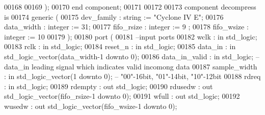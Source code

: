 \begin{DoxyCode}
00168         
00169         );
00170 \textcolor{keywordflow}{end} \textcolor{keywordflow}{component};
00171 
00172 
00173 \textcolor{keywordflow}{component} decompress \textcolor{keywordflow}{is}
00174   \textcolor{keywordflow}{generic} (
00175             dev_family      : \textcolor{comment}{string}  := \textcolor{keyword}{"Cyclone IV E"};
00176             data_width      : \textcolor{comment}{integer} := \textcolor{vhdllogic}{}\textcolor{vhdllogic}{31};
00177             fifo_rsize      : \textcolor{comment}{integer} := \textcolor{vhdllogic}{}\textcolor{vhdllogic}{9} ;
00178             fifo_wsize      : \textcolor{comment}{integer} := \textcolor{vhdllogic}{}\textcolor{vhdllogic}{10}
00179             );
00180   \textcolor{keywordflow}{port} (
00181 \textcolor{keyword}{        --input ports }
00182             wclk          : \textcolor{keywordflow}{in} \textcolor{comment}{std\_logic};
00183             rclk          : \textcolor{keywordflow}{in} \textcolor{comment}{std\_logic};
00184             reset_n       : \textcolor{keywordflow}{in} \textcolor{comment}{std\_logic};
00185             data_in       : \textcolor{keywordflow}{in} \textcolor{comment}{std\_logic\_vector}(data_width\textcolor{vhdlchar}{-}\textcolor{vhdllogic}{}\textcolor{vhdllogic}{1} \textcolor{keywordflow}{downto} \textcolor{vhdllogic}{}\textcolor{vhdllogic}{0});
00186             data_in_valid : \textcolor{keywordflow}{in} \textcolor{comment}{std\_logic}; \textcolor{keyword}{-- data\_in leading signal which indicates valid incomong data}
00187             sample_width  : \textcolor{keywordflow}{in} \textcolor{comment}{std\_logic\_vector}(\textcolor{vhdllogic}{}\textcolor{vhdllogic}{1} \textcolor{keywordflow}{downto} \textcolor{vhdllogic}{}\textcolor{vhdllogic}{0}); \textcolor{keyword}{-- "00"-16bit, "01"-14bit, "10"-12bit}
00188             rdreq         : \textcolor{keywordflow}{in} \textcolor{comment}{std\_logic};
00189             rdempty       : \textcolor{keywordflow}{out} \textcolor{comment}{std\_logic};
00190             rdusedw       : \textcolor{keywordflow}{out} \textcolor{comment}{std\_logic\_vector}(fifo_rsize\textcolor{vhdlchar}{-}\textcolor{vhdllogic}{}\textcolor{vhdllogic}{1} \textcolor{keywordflow}{downto} \textcolor{vhdllogic}{}\textcolor{vhdllogic}{0});
00191             wfull         : \textcolor{keywordflow}{out} \textcolor{comment}{std\_logic};
00192             wusedw        : \textcolor{keywordflow}{out} \textcolor{comment}{std\_logic\_vector}(fifo_wsize\textcolor{vhdlchar}{-}\textcolor{vhdllogic}{}\textcolor{vhdllogic}{1} \textcolor{keywordflow}{downto} \textcolor{vhdllogic}{}\textcolor{vhdllogic}{0});

\end{DoxyCode}
